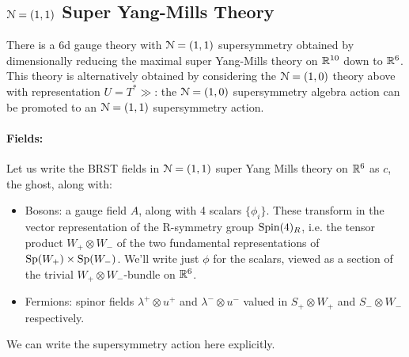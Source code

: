 \documentclass[10pt, oneside]{article}
\begin{document}
\subsection{$\mathcal{N} = (1,1)$ Super Yang-Mills Theory}

There is a 6d gauge theory with $\mathcal{N}=(1,1)$ supersymmetry obtained by dimensionally reducing the maximal super Yang-Mills theory on $\mathbb R^{10}$ down to $\mathbb R^6$. This theory is alternatively obtained by considering the $\mathcal{N}=(1,0)$ theory above with representation $U = T^*\gg$: the $\mathcal{N}=(1,0)$ supersymmetry algebra action can be promoted to an $\mathcal{N}=(1,1)$ supersymmetry action.  

\vspace{-10pt}
\paragraph{Fields:} Let us write the BRST fields in $\mathcal{N}=(1,1)$ super Yang Mills theory on $\mathbb R^6$ as $c$, the ghost, along with:
\begin{itemize}
 \item Bosons: a gauge field $A$, along with 4 scalars $\{\phi_i\}$.  These transform in the vector representation of the R-symmetry group $\mathrm{Spin}(4)_R$, i.e. the tensor product $W_+ \otimes W_-$ of the two fundamental representations of $\mathrm{Sp}(W_+) \times \mathrm{Sp}(W_-)$.  We'll write just $\phi$ for the scalars, viewed as a section of the trivial $W_+ \otimes W_-$-bundle on $\mathbb R^6$.
 \item Fermions: spinor fields $\lambda^+ \otimes u^+$ and $\lambda^- \otimes u^-$ valued in $S_+ \otimes W_+$ and $S_- \otimes W_-$ respectively.
\end{itemize}

We can write the supersymmetry action here explicitly. 
\end{document}
